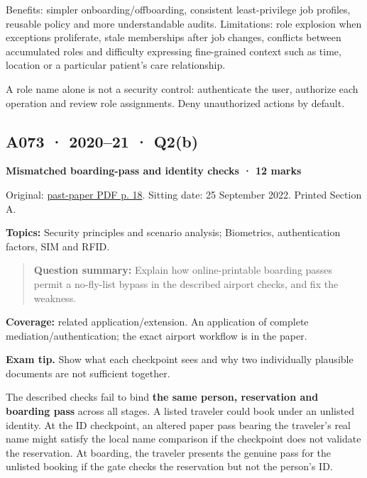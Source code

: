 \documentclass[11pt,a4paper]{article}
\begin{document}
Benefits: simpler onboarding/\allowbreak{}offboarding,\allowbreak{} consistent least-privilege job profiles,\allowbreak{} reusable policy and more understandable audits. Limitations: role explosion when exceptions proliferate,\allowbreak{} stale memberships after job changes,\allowbreak{} conflicts between accumulated roles and difficulty expressing fine-grained context such as time,\allowbreak{} location or a particular patient's care relationship.


A role name alone is not a security control: authenticate the user,\allowbreak{} authorize each operation and review role assignments. Deny unauthorized actions by default.




\clearpage
\subsection{A073 · 2020–21 · Q2(b)}\label{a073}

\textbf{Mismatched boarding-pass and identity checks · 12 marks}


Original: \href{../../CSE405-Security_Merged.pdf\#page=18}{past-paper PDF p. 18}. Sitting date: 25 September 2022. Printed Section A.


\textbf{Topics:} Security principles and scenario analysis; Biometrics,\allowbreak{} authentication factors,\allowbreak{} SIM and RFID.



\begin{quote}\small

\textbf{Question summary:} Explain how online-printable boarding passes permit a no-fly-list bypass in the described airport checks,\allowbreak{} and fix the weakness.



\end{quote}

\textbf{Coverage:} related application/\allowbreak{}extension. An application of complete mediation/\allowbreak{}authentication; the exact airport workflow is in the paper.



{\color{ForestGreen}\textbf{Exam tip.} Show what each checkpoint sees and why two individually plausible documents are not sufficient together.}


The described checks fail to bind \textbf{the same person,\allowbreak{} reservation and boarding pass} across all stages. A listed traveler could book under an unlisted identity. At the ID checkpoint,\allowbreak{} an altered paper pass bearing the traveler's real name might satisfy the local name comparison if the checkpoint does not validate the reservation. At boarding,\allowbreak{} the traveler presents the genuine pass for the unlisted booking if the gate checks the reservation but not the person's ID.
\end{document}
